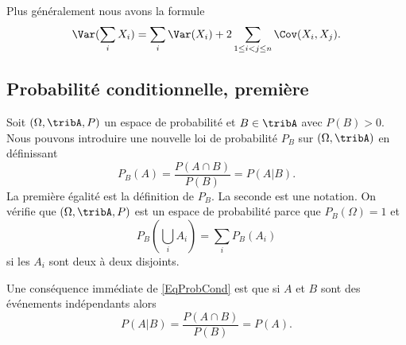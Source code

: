 Plus généralement nous avons la formule
\begin{equation}
    \Var(\sum_i X_i)=\sum_i\Var(X_i)+2\sum_{1\leq i< j\leq n}\Cov(X_i,X_j).
\end{equation}

\subsection{Probabilité conditionnelle, première}

Soit \( (\Omega,\tribA,P)\) un espace de probabilité et \( B\in\tribA\) avec $P(B)>0$. Nous pouvons introduire une nouvelle loi de probabilité \( P_B\) sur \( (\Omega,\tribA)\) en définissant
\begin{equation}    \label{EqProbCond}
    P_B(A)=\frac{ P(A\cap B) }{ P(B) }=P(A|B).
\end{equation}
La première égalité est la définition de \( P_B\). La seconde est une notation. On vérifie que \( (\Omega,\tribA,P)\) est un espace de probabilité parce que \( P_B(\Omega)=1\) et 
\begin{equation}
    P_B(\bigcup_iA_i)=\sum_iP_B(A_i)
\end{equation}
si les \( A_i\) sont deux à deux disjoints.

Une conséquence immédiate de \eqref{EqProbCond} est que si \( A\) et \( B\) sont des événements indépendants alors
\begin{equation}
    P(A|B)=\frac{ P(A\cap B) }{ P(B) }=P(A).
\end{equation}

